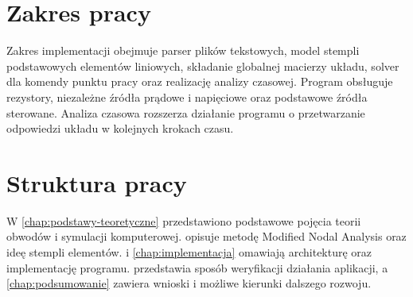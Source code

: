 \section{Zakres pracy}
\label{sec:zakres-pracy}

Zakres implementacji obejmuje parser plików tekstowych, model stempli podstawowych elementów liniowych, składanie globalnej macierzy układu, solver dla komendy punktu pracy oraz realizację analizy czasowej. Program obsługuje rezystory, niezależne źródła prądowe i napięciowe oraz podstawowe źródła sterowane. Analiza czasowa rozszerza działanie programu o przetwarzanie odpowiedzi układu w kolejnych krokach czasu.

\section{Struktura pracy}
\label{sec:struktura-pracy}

W \cref{chap:podstawy-teoretyczne} przedstawiono podstawowe pojęcia teorii obwodów i symulacji komputerowej.  opisuje metodę Modified Nodal Analysis oraz ideę stempli elementów.  i \cref{chap:implementacja} omawiają architekturę oraz implementację programu.  przedstawia sposób weryfikacji działania aplikacji, a \cref{chap:podsumowanie} zawiera wnioski i możliwe kierunki dalszego rozwoju.
